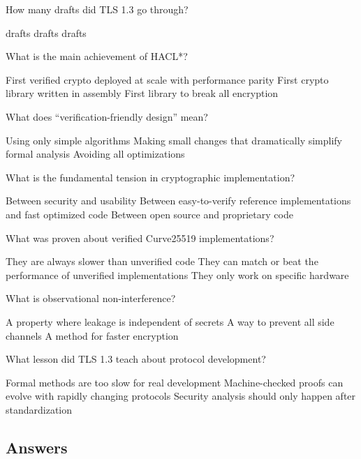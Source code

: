 \documentclass[10pt,a4paper,american]{exam}
\begin{document}
\begin{questions}
	\question How many drafts did TLS 1.3 go through?
	\begin{randomizechoices}
		 drafts
		 drafts
		 drafts
	\end{randomizechoices}

	\question What is the main achievement of HACL*?
	\begin{randomizechoices}
		\CorrectChoice First verified crypto deployed at scale with performance parity
		\choice First crypto library written in assembly
		\choice First library to break all encryption
	\end{randomizechoices}

	\question What does ``verification-friendly design'' mean?
	\begin{randomizechoices}
		\choice Using only simple algorithms
		\CorrectChoice Making small changes that dramatically simplify formal analysis
		\choice Avoiding all optimizations
	\end{randomizechoices}

	\question What is the fundamental tension in cryptographic implementation?
	\begin{randomizechoices}
		\choice Between security and usability
		\CorrectChoice Between easy-to-verify reference implementations and fast optimized code
		\choice Between open source and proprietary code
	\end{randomizechoices}

	\question What was proven about verified Curve25519 implementations?
	\begin{randomizechoices}
		\choice They are always slower than unverified code
		\CorrectChoice They can match or beat the performance of unverified implementations
		\choice They only work on specific hardware
	\end{randomizechoices}

	\question What is observational non-interference?
	\begin{randomizechoices}
		\CorrectChoice A property where leakage is independent of secrets
		\choice A way to prevent all side channels
		\choice A method for faster encryption
	\end{randomizechoices}

	\question What lesson did TLS 1.3 teach about protocol development?
	\begin{randomizechoices}
		\choice Formal methods are too slow for real development
		\CorrectChoice Machine-checked proofs can evolve with rapidly changing protocols
		\choice Security analysis should only happen after standardization
	\end{randomizechoices}

\end{questions}

\clearpage

\subsection*{Answers}
\printkeytable
\end{document}
